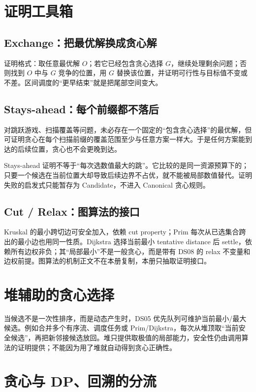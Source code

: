 \documentclass[UTF8,fontset=none,11pt,a4paper]{ctexart}
\begin{document}
\section{证明工具箱}

\subsection{Exchange：把最优解换成贪心解}

证明格式：取任意最优解 $O$；若它已经包含贪心选择 $G$，继续处理剩余问题；否则找到 $O$ 中与 $G$ 竞争的位置，用 $G$ 替换该位置，并证明可行性与目标值不变或不差。区间调度的“更早结束”就是把尾部空间变大。

\subsection{Stays-ahead：每个前缀都不落后}

对跳跃游戏、扫描覆盖等问题，未必存在一个固定的“包含贪心选择”的最优解，但可证明贪心在每个扫描前缀的覆盖范围至少与任意方案一样大。于是任何方案能到达的后续位置，贪心也不会更晚到达。

Stays-ahead 证明不等于“每次选数值最大的跳”。它比较的是同一资源预算下的；只要一个候选在当前位置大却导致后续边界不占优，就不能被局部数值替代。证明失败的启发式只能暂存为 Candidate，不进入 Canonical 贪心规则。

\subsection{Cut / Relax：图算法的接口}

Kruskal 的最小跨切边可安全加入，依赖 cut property；Prim 每次从已选集合跨出的最小边也用同一性质。Dijkstra 选择当前最小 tentative distance 后 settle，依赖所有边权非负；其“局部最小”不是一般贪心，而是带有 DS08 的 relax 不变量和边权前提。图算法的机制正文不在本册复制，本册只抽取证明接口。

\section{堆辅助的贪心选择}

当候选不是一次性排序，而是动态产生时，DS05 优先队列可维护当前最小/最大候选。例如合并多个有序流、调度任务或 Prim/Dijkstra，每次从堆顶取“当前安全候选”，再把新邻接候选放回。堆只提供取极值的局部能力，安全性仍由调用算法的证明提供；不能因为用了堆就自动得到贪心正确性。

\section{贪心与 DP、回溯的分流}
\end{document}
